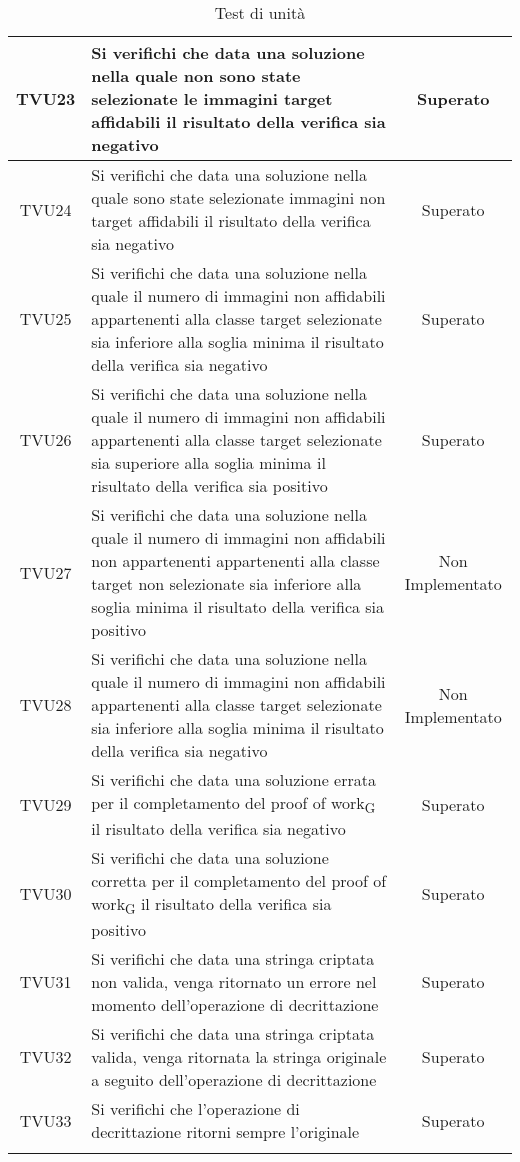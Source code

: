 \begin{center}
\begin{xltabular}{\textwidth}{|c|X|c|}
		TVU23 & Si verifichi che data una soluzione nella quale non sono state selezionate le immagini target affidabili il risultato della verifica sia negativo  & Superato\\
		\hline
		TVU24 & Si verifichi che data una soluzione nella quale sono state selezionate immagini non target affidabili il risultato della verifica sia negativo & Superato\\
		\hline
		TVU25 & Si verifichi che data una soluzione nella quale il numero di immagini non affidabili appartenenti alla classe target selezionate sia inferiore alla soglia minima il risultato della verifica sia negativo & Superato\\
		\hline
		TVU26 & Si verifichi che data una soluzione nella quale il numero di immagini non affidabili appartenenti alla classe target selezionate sia superiore alla soglia minima il risultato della verifica sia positivo & Superato\\
		\hline
		TVU27 & Si verifichi che data una soluzione nella quale il numero di immagini non affidabili non appartenenti appartenenti alla classe target non selezionate sia inferiore alla soglia minima il risultato della verifica sia positivo & Non Implementato\\
		\hline
		TVU28 &  Si verifichi che data una soluzione nella quale il numero di immagini non affidabili appartenenti alla classe target selezionate sia inferiore alla soglia minima il risultato della verifica sia negativo & Non Implementato\\
		\hline
		TVU29 & Si verifichi che data una soluzione errata per il completamento del proof of work\textsubscript{G} il risultato della verifica sia negativo & Superato\\
		\hline
		TVU30 & Si verifichi che data una soluzione corretta per il completamento del proof of work\textsubscript{G} il risultato della verifica sia positivo & Superato\\
		\hline
		TVU31 & Si verifichi che data una stringa criptata non valida, venga ritornato un errore nel momento dell'operazione di decrittazione & Superato\\
		\hline
		TVU32 & Si verifichi che data una stringa criptata valida, venga ritornata la stringa originale a seguito dell'operazione di decrittazione & Superato\\
		\hline
		TVU33 & Si verifichi che l'operazione di decrittazione ritorni sempre l'originale & Superato\\
		\hline
		\caption{Test di unità}
	\end{xltabular}
\end{center}


